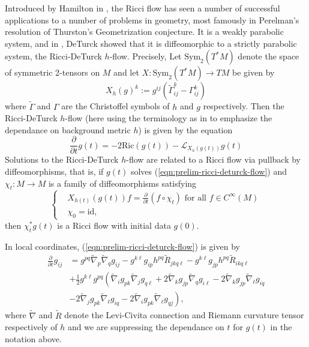 \documentclass[12pt]{amsart}
\theoremstyle{plain}
\theoremstyle{plain}
\theoremstyle{definition}
\theoremstyle{remark}
\numberwithin{equation}{subsection}
\newcommand{\hdel}{\tilde{\nabla}}
\begin{document}
Introduced by Hamilton in \cite{hamilton_three-manifolds_1982}, the Ricci flow has seen a number of successful applications to a number of problems in geometry, most famously in Perelman's resolution of Thurston's Geometrization conjecture. It is a weakly parabolic system, and in \cite{deturck_deforming_1983}, DeTurck showed that it is diffeomorphic to a strictly parabolic system, the Ricci-DeTurck $h$-flow. Precisely, Let $\text{Sym}_2(T^\ast M)$ denote the space of symmetric 2-tensors on $M$ and let $X:\text{Sym}_2(T^\ast M) \to TM$ be given by
\begin{equation*}
    X_{h}(g)^k := g^{ij}\left(\tilde{\Gamma}^k_{ij} - \Gamma^k_{ij}\right)
\end{equation*}
where $\tilde{\Gamma}$ and $\Gamma$ are the Christoffel symbols of $h$ and $g$ respectively. Then the Ricci-DeTurck $h$-flow (here using the terminology as in \cite{simon_deformation_2002} to emphasize the dependance on background metric $h$) is given by the equation
\begin{equation}\label{eqn:prelim-ricci-deturck-flow}
    \frac{\partial}{\partial t} g(t) = -2\text{Ric}(g(t)) - \mathcal{L}_{X_{h}(g(t))}g(t)
\end{equation}
Solutions to the Ricci-DeTurck $h$-flow are related to a Ricci flow via pullback by diffeomorphisms, that is, if $g(t)$ solves (\ref{eqn:prelim-ricci-deturck-flow}) and $\chi_t:M\to M$ is a family of diffeomorphisms satisfying
\begin{equation}\label{eqn:prelim-rdf-to-rf-diffeomorphisms}
    \begin{cases}
        &X_{h(t)}(g(t))f = \frac{\partial}{\partial t}\left(f \circ \chi_t\right) \text{ for all } f \in C^\infty(M) \\
        &\chi_0 = \text{id},
    \end{cases}
\end{equation}
then $\chi_t^\ast g(t)$ is a Ricci flow with initial data $g(0)$.

In local coordinates, (\ref{eqn:prelim-ricci-deturck-flow}) is given by
\begin{align}\label{eqn:prelim-rdf-local-coords}
    \frac{\partial}{\partial t} g_{ij} &= g^{pq}\hdel_p\hdel_qg_{ij} - g^{k\ell}g_{ip}h^{pq}\tilde{R}_{jkq\ell} - g^{k\ell}g_{jp}h^{pq}\tilde{R}_{ikq\ell} \nonumber \\
    &+ \frac{1}{2}g^{k\ell}g^{pq}\left(\hdel_i g_{pk}\hdel_j g_{q\ell} + 2\hdel_k g_{jp}\hdel_q g_{i\ell} - 2\hdel_k g_{jp} \hdel_\ell g_{iq} \right. \nonumber \\
    &\left. -2\hdel_j g_{pk} \hdel_\ell g_{iq} - 2\hdel_i g_{pk} \hdel_\ell g_{qj}\right),
\end{align}
where $\hdel$ and $\tilde{R}$ denote the Levi-Civita connection and Riemann curvature tensor respectively of $h$ and we are suppressing the dependance on $t$ for $g(t)$ in the notation above.
\end{document}
